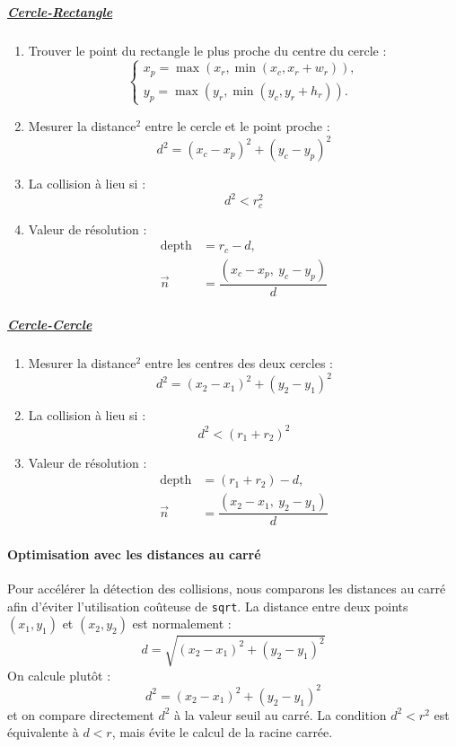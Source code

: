 \documentclass[a4paper,11pt]{article}
\begin{document}
\noindent\begin{minipage}[t]{0.48\textwidth}
\subparagraph*{\underline{\small\textbf{Cercle-Rectangle}}}  
\begin{enumerate}[leftmargin=*,topsep=2pt,itemsep=2pt]
    \item Trouver le point du rectangle le plus proche du centre du cercle : 
    \[
    \begin{cases} 
        x_p = \max(x_r, \min(x_c, x_r + w_r)), \\[2pt]
        y_p = \max(y_r, \min(y_c, y_r + h_r)).
    \end{cases}
    \]
    \item Mesurer la distance\(^2\) entre le cercle et le point proche :  
    \[
    d^2 = (x_c - x_p)^2 + (y_c - y_p)^2
    \]
    \item La collision à lieu si  :  
    \[
    d^2 < r_c^2
    \]
    \item Valeur de résolution :  
    \[
    \boxed{
        \begin{aligned}
            \text{depth} &= r_c - d, \\[2pt]
            \vec{n} &= \dfrac{(x_c - x_p,\ y_c - y_p)}{d}
        \end{aligned}
    }
    \]
\end{enumerate}
\end{minipage}
\hfill
\begin{minipage}[t]{0.48\textwidth}
\subparagraph*{\underline{\small\textbf{Cercle-Cercle}}}  
\begin{enumerate}[leftmargin=*,topsep=2pt,itemsep=2pt]
    \item Mesurer la distance\(^2\) entre les centres des deux cercles :  
    \[
    d^2 = (x_2 - x_1)^2 + (y_2 - y_1)^2
    \]
    \item La collision à lieu si :  
    \[
    d^2 < (r_1 + r_2)^2
    \]
    \item Valeur de résolution : 
    \[
    \boxed{
        \begin{aligned}
            \text{depth} &= (r_1 + r_2) - d, \\[2pt]
            \vec{n} &= \dfrac{(x_2 - x_1,\ y_2 - y_1)}{d}
        \end{aligned}
    }
    \]
\end{enumerate}
\end{minipage}

\paragraph{Optimisation avec les distances au carré}
\label{sec:optimisation}
Pour accélérer la détection des collisions, nous comparons les distances au carré afin d'éviter l'utilisation coûteuse de \texttt{sqrt}. La distance entre deux points \((x_1,y_1)\) et \((x_2,y_2)\) est normalement :
\[d = \sqrt{(x_2-x_1)^2 + (y_2-y_1)^2}\]
On calcule plutôt :
\[d^2 = (x_2-x_1)^2 + (y_2-y_1)^2\]
et on compare directement \(d^2\) à la valeur seuil au carré. La condition \(d^2 < r^2\) est équivalente à \(d < r\), mais évite le calcul de la racine carrée.
\end{document}
